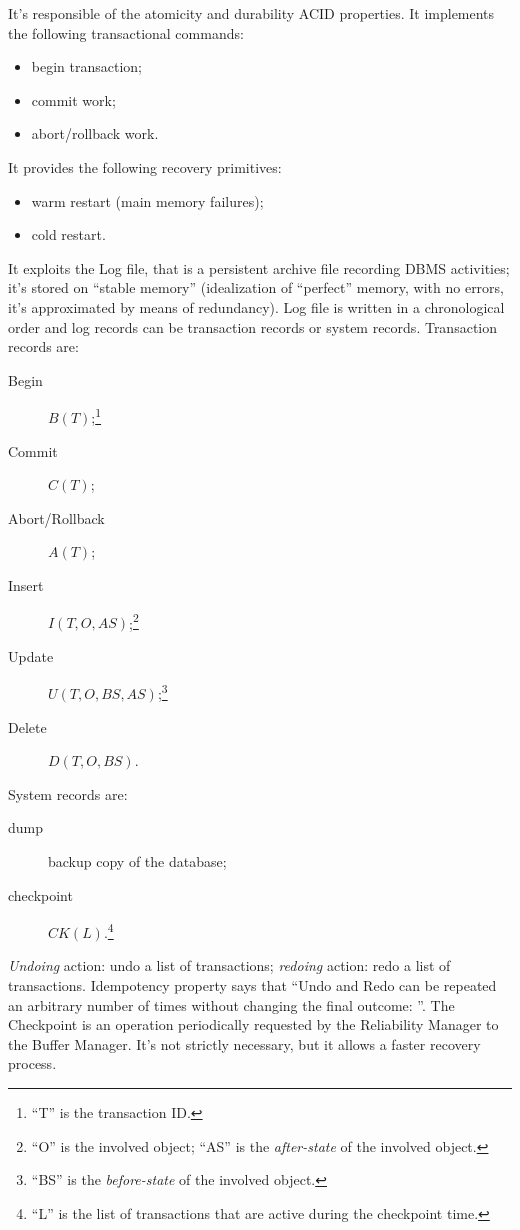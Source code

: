 It's responsible of the atomicity and durability ACID properties.
It implements the following transactional commands:
\begin{itemize}
	\item begin transaction;
	\item commit work;
	\item abort/rollback work.
\end{itemize}
It provides the following recovery primitives:
\begin{itemize}
	\item warm restart (main memory failures);
	\item cold restart.
\end{itemize}
It exploits the Log file, that is a persistent archive file recording DBMS activities; it's stored on ``stable memory'' (idealization of ``perfect'' memory, with no errors, it's approximated by means of redundancy).
Log file is written in a chronological order and log records can be transaction records or system records.
Transaction records are:
\begin{description}
	\item[Begin] $B(T)$;\footnote{``T'' is the transaction ID.}
	\item[Commit] $C(T)$;
	\item[Abort/Rollback] $A(T)$;
	\item[Insert] $I(T, O, AS)$;\footnote{``O'' is the involved object; ``AS'' is the \emph{after-state} of the involved object.}
	\item[Update] $U(T, O, BS, AS)$;\footnote{``BS'' is the \emph{before-state} of the involved object.}
	\item[Delete] $D(T, O, BS)$.
\end{description}
System records are:
\begin{description}
	\item[dump] backup copy of the database;
	\item[checkpoint] $CK(L)$.\footnote{``L'' is the list of transactions that are active during the checkpoint time.}
\end{description}
\emph{Undoing} action: undo a list of transactions; \emph{redoing} action: redo a list of transactions.
Idempotency property says that ``Undo and Redo can be repeated an arbitrary number of times without changing the final outcome: ''.
The Checkpoint is an operation periodically requested by the Reliability Manager to the Buffer Manager.
It's not strictly necessary, but it allows a faster recovery process.
